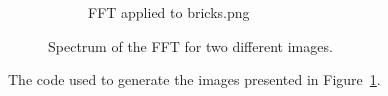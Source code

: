 \begin{figure}[H]
\begin{subfigure}{0.5\textwidth}
        \caption{FFT applied to bricks.png}
    \end{subfigure}

    \caption{Spectrum of the FFT for two different images.}
    \label{fig:3-1}
\end{figure}

The code used to generate the images presented in Figure~\ref{fig:3-1}.
\inputminted[linenos=true]{octave}{../code/3.1.m}

